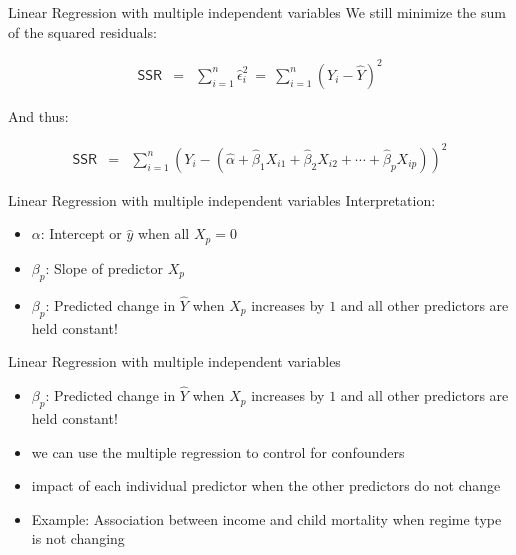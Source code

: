 \documentclass[presentation]{beamer}
\begin{document}
\begin{frame}[label={sec:org489c360}]{Linear Regression with multiple independent variables}
We still minimize the sum of the squared residuals:


\begin{eqnarray*}
      \textsf{SSR} & = & \sum_{i=1}^n \hat\epsilon_i^2 \ = \ \sum_{i=1}^n
                         (Y_i - \hat{Y})^2
    \end{eqnarray*}

And thus:

\begin{eqnarray*}

 \textsf{SSR} &=& \sum_{i=1}^n (Y_i - (\hat\alpha + \hat\beta_1 X_{i1} +
                         \hat\beta_2 X_{i2} + \cdots + \hat\beta_p X_{ip}))^2
    \end{eqnarray*}
\end{frame}



\begin{frame}[label={sec:org5bb9688}]{Linear Regression with multiple independent variables}
Interpretation:

\begin{itemize}
\item \(\alpha\): Intercept or \(\hat{y}\) when all \(X_{p} = 0\)
\end{itemize}

\pause

\begin{itemize}
\item \(\beta_{p}\): Slope of predictor \(X_{p}\)
\end{itemize}

\pause

\begin{itemize}
\item \(\beta_{p}\): Predicted change in \(\hat{Y}\) when \(X_{p}\) increases by \(1\) \alert{and} all other predictors \alert{are held constant}!
\end{itemize}
\end{frame}



\begin{frame}[label={sec:orgd871f47}]{Linear Regression with multiple independent variables}
\begin{itemize}
\item \(\beta_{p}\): Predicted change in \(\hat{Y}\) when \(X_{p}\) increases by \(1\) \alert{and} all other predictors \alert{are held constant}!

\item we can use the multiple regression to \alert{control for confounders}
\end{itemize}

\pause

\begin{itemize}
\item impact of each individual predictor when the other predictors do not change

\item Example: Association between income and child mortality when regime type is not changing
\end{itemize}
\end{frame}
\end{document}

